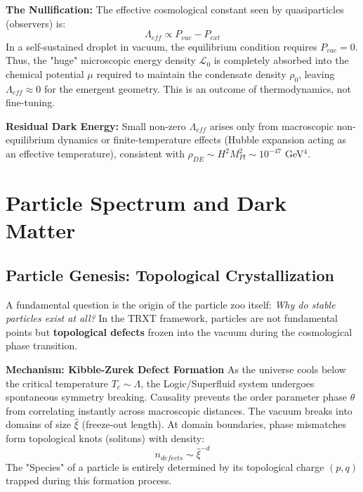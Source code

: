 \documentclass[a4paper,12pt]{article}
\begin{document}
\textbf{The Nullification:}
The effective cosmological constant seen by quasiparticles (observers) is:
\begin{equation}
    \Lambda_{eff} \propto P_{vac} - P_{ext}
\end{equation}
In a self-sustained droplet in vacuum, the equilibrium condition requires $P_{vac} = 0$.
Thus, the "huge" microscopic energy density $\mathcal{L}_0$ is completely absorbed into the chemical potential $\mu$ required to maintain the condensate density $\rho_0$, leaving $\Lambda_{eff} \approx 0$ for the emergent geometry. This is an outcome of thermodynamics, not fine-tuning.

\textbf{Residual Dark Energy:}
Small non-zero $\Lambda_{eff}$ arises only from macroscopic non-equilibrium dynamics or finite-temperature effects (Hubble expansion acting as an effective temperature), consistent with $\rho_{DE} \sim H^2 M_{Pl}^2 \sim 10^{-47}$ GeV$^4$.

\section{Particle Spectrum and Dark Matter}

\subsection{Particle Genesis: Topological Crystallization}

A fundamental question is the origin of the particle zoo itself: \emph{Why do stable particles exist at all?}
In the TRXT framework, particles are not fundamental points but \textbf{topological defects} frozen into the vacuum during the cosmological phase transition.

\textbf{Mechanism: Kibble-Zurek Defect Formation}
As the universe cools below the critical temperature $T_c \sim \Lambda$, the Logic/Superfluid system undergoes spontaneous symmetry breaking. Causality prevents the order parameter phase $\theta$ from correlating instantly across macroscopic distances. The vacuum breaks into domains of size $\hat{\xi}$ (freeze-out length).
At domain boundaries, phase mismatches form topological knots (solitons) with density:
\begin{equation}
n_{defects} \sim \hat{\xi}^{-d}
\end{equation}
The "Species" of a particle is entirely determined by its topological charge $(p,q)$ trapped during this formation process.
\end{document}
